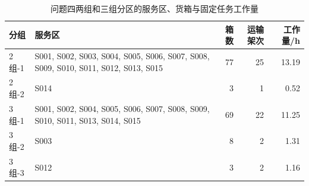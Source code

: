 \begin{table}[H]\centering\normalsize
\caption{问题四两组和三组分区的服务区、货箱与固定任务工作量}\label{tab:q4_groups}
\begin{tabular}{l>{\raggedright\arraybackslash}p{8.0cm}rrr}
\toprule
分组 & 服务区 & 箱数 & 运输架次 & 工作量/h\\\midrule
2组-1 & S001, S002, S003, S004, S005, S006, S007, S008, S009, S010, S011, S012, S013, S015 & 77 & 25 & 13.19\\
2组-2 & S014 & 3 & 1 & 0.52\\
3组-1 & S001, S002, S004, S005, S006, S007, S008, S009, S010, S011, S013, S014, S015 & 69 & 22 & 11.25\\
3组-2 & S003 & 8 & 2 & 1.31\\
3组-3 & S012 & 3 & 2 & 1.16\\
\bottomrule\end{tabular}
\end{table}
